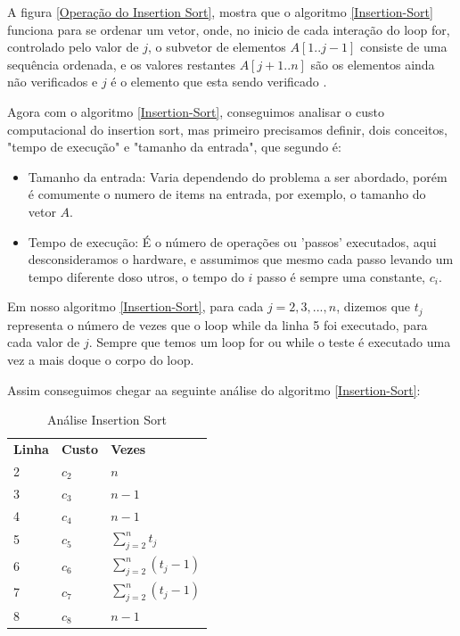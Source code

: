 \documentclass[
	12pt,				%
	openright,			%
	oneside,			%
	a4paper,			%
	english,			%
	brazil				%
	]{abntex2}
\begin{document}
A figura \ref{Operação do Insertion Sort}, mostra que o algoritmo \ref{Insertion-Sort} funciona para se ordenar um vetor,
onde, no inicio de cada interação do loop for, controlado pelo valor de $j$, o subvetor de elementos $A[1..j-1]$ consiste
de uma sequência ordenada, e os valores restantes $A[j+1..n]$ são os elementos ainda não verificados e $j$ é o elemento
que esta sendo verificado \cite{introductionAlgorthms}.

Agora com o algoritmo \ref{Insertion-Sort}, conseguimos analisar o custo computacional do insertion sort, mas primeiro
precisamos definir, dois conceitos, "tempo de execução" e "tamanho da entrada", que segundo \cite{introductionAlgorthms} é:

\begin{itemize}
	\item Tamanho da entrada: Varia dependendo do problema a ser abordado, porém é comumente o numero de items na entrada,
	por exemplo, o tamanho do vetor $A$.
	\item Tempo de execução: É o número de operações ou 'passos' executados, aqui desconsideramos o hardware, e assumimos
	que mesmo cada passo levando um tempo diferente doso utros, o tempo do $i$ passo é sempre uma constante, $c_i$.  
\end{itemize}

Em nosso algoritmo \ref{Insertion-Sort}, para cada $j = 2, 3, ..., n$, dizemos que $t_j$ representa o número de vezes que
o loop while da linha 5 foi executado, para cada valor de $j$. Sempre que temos um loop for ou while o teste é
executado uma vez a mais doque o corpo do loop.

Assim conseguimos chegar aa seguinte análise do algoritmo \ref{Insertion-Sort}:

\begin{table}[H]
	\centering
	\caption{\label{Análise-Insertion-Sort} Análise Insertion Sort}
	\begin{tabular}{lll}
		\textbf{Linha} & \textbf{Custo} & \textbf{Vezes} \\
		2 & $c_2$ & $n$ \\
		3 & $c_3$ & $n-1$ \\
		4 & $c_4$ & $n-1$ \\
		5 & $c_5$ & $\sum_{j=2}^{n} t_j$ \\
		6 & $c_6$ & $\sum_{j=2}^{n} (t_j - 1)$ \\
		7 & $c_7$ & $\sum_{j=2}^{n} (t_j - 1)$ \\
		8 & $c_8$ & $n-1$ \\
	\end{tabular}
\end{table}
\end{document}
